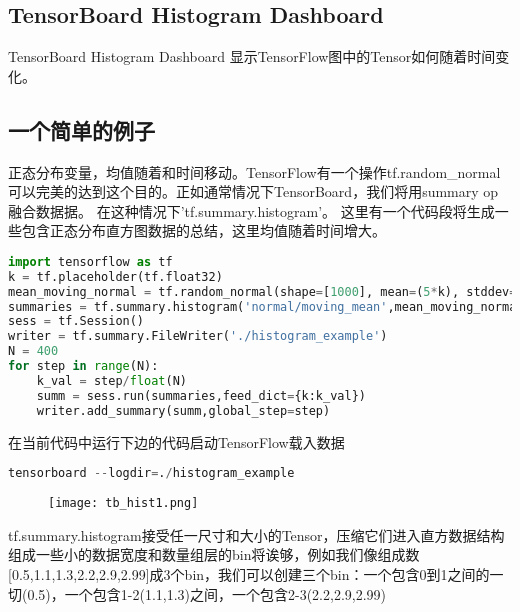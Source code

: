  


\subsection{TensorBoard Histogram Dashboard}

TensorBoard Histogram Dashboard 显示TensorFlow图中的Tensor如何随着时间变化。
\subsection{一个简单的例子}
正态分布变量，均值随着和时间移动。TensorFlow有一个操作tf.random\_normal可以完美的达到这个目的。正如通常情况下TensorBoard，我们将用summary op融合数据据。
在这种情况下'tf.summary.histogram'。
这里有一个代码段将生成一些包含正态分布直方图数据的总结，这里均值随着时间增大。
\begin{lstlisting}[language=Python]
import tensorflow as tf
k = tf.placeholder(tf.float32)
mean_moving_normal = tf.random_normal(shape=[1000], mean=(5*k), stddev=1)
summaries = tf.summary.histogram('normal/moving_mean',mean_moving_normal)
sess = tf.Session()
writer = tf.summary.FileWriter('./histogram_example')
N = 400
for step in range(N):
    k_val = step/float(N)
    summ = sess.run(summaries,feed_dict={k:k_val})
    writer.add_summary(summ,global_step=step)
\end{lstlisting}
在当前代码中运行下边的代码启动TensorFlow载入数据
\begin{lstlisting}[language=Python]
tensorboard --logdir=./histogram_example
\end{lstlisting}
\begin{center}
\begin{figure}[H]
\texttt{[image: tb\_hist1.png]}
\end{figure}
\end{center}
tf.summary.histogram接受任一尺寸和大小的Tensor，压缩它们进入直方数据结构组成一些小的数据宽度和数量组层的bin将诶够，例如我们像组成数[0.5,1.1,1.3,2.2,2.9,2.99]成3个bin，我们可以创建三个bin：一个包含0到1之间的一切(0.5)，一个包含1-2(1.1,1.3)之间，一个包含2-3(2.2,2.9,2.99)

